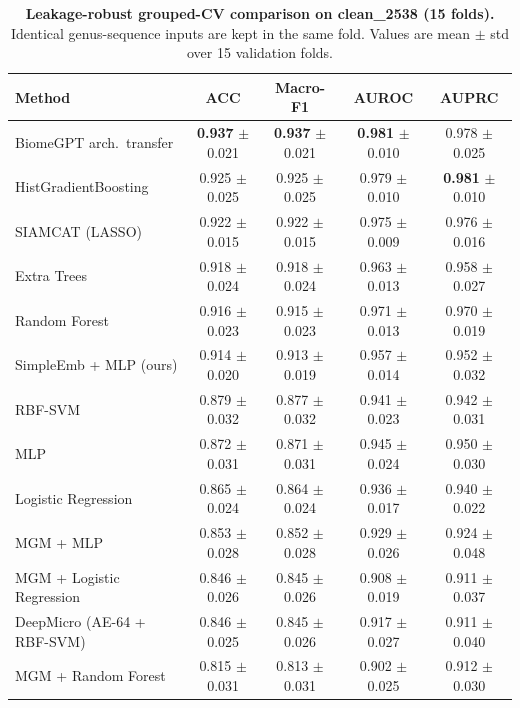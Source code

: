 \documentclass{article} %
\begin{document}
\begin{table}[ht]
\centering
\caption{\textbf{Leakage-robust grouped-CV comparison on clean\_2538 (15 folds).}
Identical genus-sequence inputs are kept in the same fold.
Values are mean $\pm$ std over 15 validation folds.}
\label{tab:groupcv}
\begin{tabular}{lcccc}
\toprule
\textbf{Method} & \textbf{ACC} & \textbf{Macro-F1} & \textbf{AUROC} & \textbf{AUPRC} \\
\midrule
BiomeGPT arch.\ transfer & \textbf{0.937} $\pm$ 0.021 & \textbf{0.937} $\pm$ 0.021 & \textbf{0.981} $\pm$ 0.010 & 0.978 $\pm$ 0.025 \\
HistGradientBoosting & 0.925 $\pm$ 0.025 & 0.925 $\pm$ 0.025 & 0.979 $\pm$ 0.010 & \textbf{0.981} $\pm$ 0.010 \\
SIAMCAT (LASSO) & 0.922 $\pm$ 0.015 & 0.922 $\pm$ 0.015 & 0.975 $\pm$ 0.009 & 0.976 $\pm$ 0.016 \\
Extra Trees & 0.918 $\pm$ 0.024 & 0.918 $\pm$ 0.024 & 0.963 $\pm$ 0.013 & 0.958 $\pm$ 0.027 \\
Random Forest & 0.916 $\pm$ 0.023 & 0.915 $\pm$ 0.023 & 0.971 $\pm$ 0.013 & 0.970 $\pm$ 0.019 \\
SimpleEmb + MLP (ours) & 0.914 $\pm$ 0.020 & 0.913 $\pm$ 0.019 & 0.957 $\pm$ 0.014 & 0.952 $\pm$ 0.032 \\
RBF-SVM & 0.879 $\pm$ 0.032 & 0.877 $\pm$ 0.032 & 0.941 $\pm$ 0.023 & 0.942 $\pm$ 0.031 \\
MLP & 0.872 $\pm$ 0.031 & 0.871 $\pm$ 0.031 & 0.945 $\pm$ 0.024 & 0.950 $\pm$ 0.030 \\
Logistic Regression & 0.865 $\pm$ 0.024 & 0.864 $\pm$ 0.024 & 0.936 $\pm$ 0.017 & 0.940 $\pm$ 0.022 \\
MGM + MLP & 0.853 $\pm$ 0.028 & 0.852 $\pm$ 0.028 & 0.929 $\pm$ 0.026 & 0.924 $\pm$ 0.048 \\
MGM + Logistic Regression & 0.846 $\pm$ 0.026 & 0.845 $\pm$ 0.026 & 0.908 $\pm$ 0.019 & 0.911 $\pm$ 0.037 \\
DeepMicro (AE-64 + RBF-SVM) & 0.846 $\pm$ 0.025 & 0.845 $\pm$ 0.026 & 0.917 $\pm$ 0.027 & 0.911 $\pm$ 0.040 \\
MGM + Random Forest & 0.815 $\pm$ 0.031 & 0.813 $\pm$ 0.031 & 0.902 $\pm$ 0.025 & 0.912 $\pm$ 0.030 \\
\bottomrule
\end{tabular}
\end{table}
\end{document}
